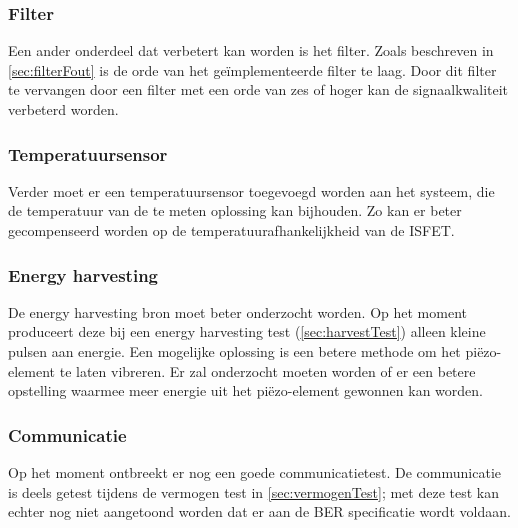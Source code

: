 \subsubsection*{Filter}
Een ander onderdeel dat verbetert kan worden is het filter. Zoals beschreven in \cref{sec:filterFout} is de orde van het geïmplementeerde filter te laag. Door dit filter te vervangen door een filter met een orde van zes of hoger kan de signaalkwaliteit verbeterd worden.

\subsubsection*{Temperatuursensor}
Verder moet er een temperatuursensor toegevoegd worden aan het systeem, die de temperatuur van de te meten oplossing kan bijhouden. Zo kan er beter gecompenseerd worden op de temperatuurafhankelijkheid van de ISFET.

\subsubsection*{Energy harvesting}
De energy harvesting bron moet beter onderzocht worden. Op het moment produceert deze bij een energy harvesting test (\cref{sec:harvestTest}) alleen kleine pulsen aan energie. Een mogelijke oplossing is een betere methode om het piëzo-element te laten vibreren. Er zal onderzocht moeten worden of er een betere opstelling waarmee meer energie uit het piëzo-element gewonnen kan worden.

\subsubsection*{Communicatie}
Op het moment ontbreekt er nog een goede communicatietest. De communicatie is deels getest tijdens de vermogen test in \cref{sec:vermogenTest}; met deze test kan echter nog niet aangetoond worden dat er aan de BER specificatie wordt voldaan.





